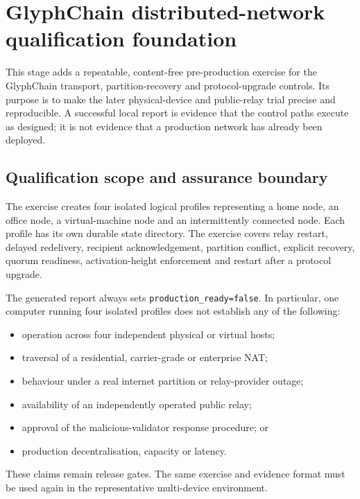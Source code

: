 \section{GlyphChain distributed-network qualification foundation}
\label{sec:glyphchain-distributed-network-qualification}

This stage adds a repeatable, content-free pre-production exercise for the
GlyphChain transport, partition-recovery and protocol-upgrade controls.  Its
purpose is to make the later physical-device and public-relay trial precise and
reproducible.  A successful local report is evidence that the control paths
execute as designed; it is not evidence that a production network has already
been deployed.

\subsection{Qualification scope and assurance boundary}

The exercise creates four isolated logical profiles representing a home node,
an office node, a virtual-machine node and an intermittently connected node.
Each profile has its own durable state directory.  The exercise covers relay
restart, delayed redelivery, recipient acknowledgement, partition conflict,
explicit recovery, quorum readiness, activation-height enforcement and restart
after a protocol upgrade.

The generated report always sets \texttt{production\_ready=false}.  In
particular, one computer running four isolated profiles does not establish any
of the following:

\begin{itemize}
  \item operation across four independent physical or virtual hosts;
  \item traversal of a residential, carrier-grade or enterprise NAT;
  \item behaviour under a real internet partition or relay-provider outage;
  \item availability of an independently operated public relay;
  \item approval of the malicious-validator response procedure; or
  \item production decentralisation, capacity or latency.
\end{itemize}

These claims remain release gates.  The same exercise and evidence format must
be used again in the representative multi-device environment.

